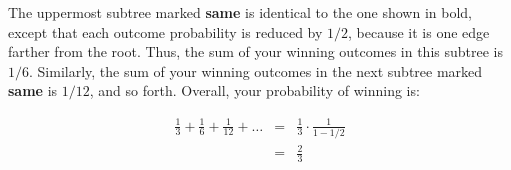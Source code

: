 \documentclass[12pt,twoside]{article}
\begin{document}
\begin{problem}{25}
{The uppermost subtree marked {\bf same} is identical to the one
shown in bold, except that each outcome probability is reduced by
$1/2$, because it is one edge farther from the root.  Thus, the sum of
your winning outcomes in this subtree is $1/6$.  Similarly, the sum of
your winning outcomes in the next subtree marked {\bf same} is $1/12$,
and so forth.  Overall, your probability of winning is:

\begin{eqnarray*}
\frac{1}{3} + \frac{1}{6} + \frac{1}{12} + \ldots
	& = & \frac{1}{3} \cdot \frac{1}{1 - 1/2} \\
	& = & \frac{2}{3}
\end{eqnarray*}
}

\end{problem}

\end{document}
